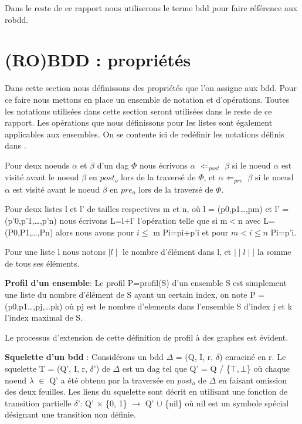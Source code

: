 \documentclass[french]{article}
\begin{document}
Dans le reste de ce rapport nous utiliserons le terme bdd pour faire référence aux robdd.
\newpage
\section{(RO)BDD : propriétés}
Dans cette section nous définissons des propriétés que l'on assigne aux bdd. Pour ce faire nous mettons en place un ensemble de notation et d'opérations. Toutes les notations utilisées dans cette section seront utilisées dans le reste de ce rapport. Les opérations que nous définissons pour les listes sont également applicables aux ensembles. On se contente ici de redéfinir les notations définis dans \cite{genitrini}.
\vspace{5mm} 

Pour deux noeuds \(\alpha\) et \(\beta\) d'un dag \(\Phi\) nous écrivons \(\alpha\) \(\Leftarrow_{post}\) \(\beta\) si le noeud \(\alpha\) est visité avant le noeud \(\beta\) en \(post_{o}\) lors de la traversé de \(\Phi\), et \(\alpha\)\(\Leftarrow_{pre}\) \(\beta\) si le noeud \(\alpha\) est visité avant le noeud \(\beta\) en \(pre_{o}\) lors de la traversé de \(\Phi\).
\vspace{5mm} 

Pour deux listes l et l’ de tailles respectives m et n, où l = (p0,p1…,pm) et l’ = (p’0,p’1,…,p’n) nous écrivons L=l+l’ l'opération telle que si m\(<\)n avec L=(P0,P1,…,Pn) alors nous avons pour \(i\leq\) m Pi=pi+p’i et pour \(m<i\leq n\) Pi=p’i.

Pour une liste l nous notons \(\mid l\mid \) le nombre d'élément dans l, et \(\mid\mid l\mid\mid\) la somme de tous ses éléments.
\vspace{5mm} 

\textbf{Profil d'un ensemble}: Le profil P=profil(S) d'un ensemble S est simplement une liste du nombre d'élément de S ayant un certain index, on note P = (p0,p1…,pj,…pk) où pj est le nombre d'elements dans l'ensemble S d'index j et k l'index maximal de S. 

Le processus d'extension de cette définition de profil à des graphes est évident.
\vspace{5mm} 

\textbf{Squelette d'un bdd} : Considérons un bdd \(\Delta\) = (Q, I, r, \(\delta\)) enraciné en r. Le squelette T = (Q’, I, r, \(\delta\)’) de \(\Delta\) est un dag tel que Q’ = Q / \{\(\top,\bot\)\} où chaque noeud \(\lambda\) \(\in\) Q’ a été obtenu par la traversée en \(post_{o}\) de \(\Delta\) en faisant omission des deux feuilles. Les liens du squelette sont décrit en utilisant une fonction de transition partielle \(\delta\)’: Q’ \(\times\) \{0, 1\} \(\rightarrow\) Q' \(\cup\) \{nil\} où nil est un symbole spécial désignant une transition non définie.
\end{document}
